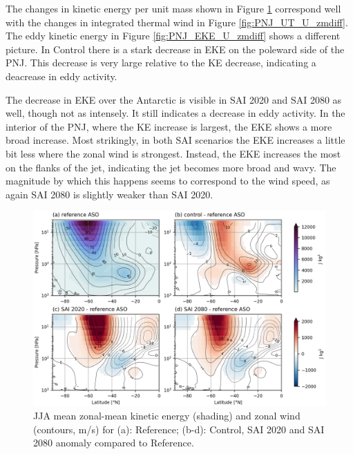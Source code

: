 The changes in kinetic energy per unit mass shown in Figure \ref{fig:PNJ_KE_U_zmdiff} correspond well with the changes in integrated thermal wind in Figure \ref{fig:PNJ_UT_U_zmdiff}. The eddy kinetic energy in Figure \ref{fig:PNJ_EKE_U_zmdiff} shows a different picture. In Control there is a stark decrease in EKE on the poleward side of the PNJ. This decrease is very large relative to the KE decrease, indicating a deacrease in eddy activity.

The decrease in EKE over the Antarctic is visible in SAI 2020 and SAI 2080 as well, though not as intensely. It still indicates a decrease in eddy activity. In the interior of the PNJ, where the KE increase is largest, the EKE shows a more broad increase. Most strikingly, in both SAI scenarios the EKE increases a little bit less where the zonal wind is strongest. Instead, the EKE increases the most on the flanks of the jet, indicating the jet becomes more broad and wavy. The magnitude by which this happens seems to correspond to the wind speed, as again SAI 2080 is slightly weaker than SAI 2020.


\begin{figure}[H]
	\centering
	\includegraphics[width=0.95\linewidth]{images/PNJ_KE_U_zmdiff.png}
	\caption{JJA mean zonal-mean kinetic energy (shading) and zonal wind (contours, m/s) for (a): Reference; (b-d): Control, SAI 2020 and SAI 2080 anomaly compared to Reference.}
	\label{fig:PNJ_KE_U_zmdiff}
\end{figure}



